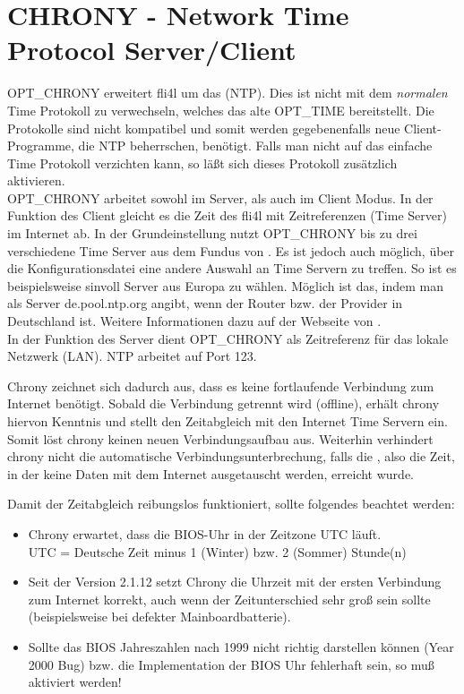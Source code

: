 {
\section {CHRONY - Network Time Protocol Server/Client}
}

OPT\_CHRONY erweitert fli4l um das  (NTP). Dies ist nicht mit dem \emph{normalen} Time Protokoll zu
verwechseln, welches das alte OPT\_TIME bereitstellt. Die Protokolle sind nicht
kompatibel und somit werden gegebenenfalls neue Client-Programme, die NTP
beherrschen, benötigt. Falls man nicht auf das einfache Time Protokoll
verzichten kann, so läßt sich dieses Protokoll zusätzlich aktivieren.\\
OPT\_CHRONY arbeitet sowohl im  Server, als auch im Client Modus. In der
Funktion des Client gleicht es die Zeit des fli4l mit Zeitreferenzen (Time
Server) im Internet ab. In der Grundeinstellung nutzt OPT\_CHRONY bis zu drei
verschiedene Time Server aus dem Fundus von
. Es ist jedoch auch möglich, über die
Konfigurationsdatei eine andere Auswahl an Time Servern zu treffen.
So ist es beispielsweise sinvoll Server aus Europa zu wählen. Möglich ist das,
indem man als Server de.pool.ntp.org angibt, wenn der Router bzw. der Provider 
in Deutschland ist. Weitere Informationen dazu auf der Webseite von 
.\\

In der Funktion des Server dient OPT\_CHRONY als Zeitreferenz für das lokale
Netzwerk (LAN). NTP arbeitet auf Port 123.

Chrony zeichnet sich dadurch aus, dass es keine fortlaufende Verbindung zum
Internet benötigt. Sobald die Verbindung getrennt wird (offline), erhält
chrony hiervon Kenntnis und stellt den Zeitabgleich mit den Internet Time
Servern ein. Somit löst chrony keinen neuen Verbindungsaufbau aus. Weiterhin
verhindert chrony nicht die automatische Verbindungsunterbrechung, falls die
, also die Zeit, in der keine Daten mit dem Internet
ausgetauscht werden, erreicht wurde.

Damit der Zeitabgleich reibungslos funktioniert, sollte folgendes beachtet
werden:
\begin{itemize}
  \item Chrony erwartet, dass die BIOS-Uhr in der Zeitzone UTC läuft. \\
        UTC = Deutsche Zeit minus 1 (Winter) bzw. 2 (Sommer) Stunde(n)
  \item Seit der Version 2.1.12 setzt Chrony die Uhrzeit mit der ersten
        Verbindung zum Internet korrekt, auch wenn der Zeitunterschied 
	sehr groß sein sollte (beispielsweise bei defekter Mainboardbatterie).
  \item Sollte das BIOS Jahreszahlen nach 1999 nicht richtig darstellen können 
        (Year 2000 Bug) bzw. die Implementation der BIOS Uhr fehlerhaft sein,
	so muß  aktiviert werden!
\end{itemize}


